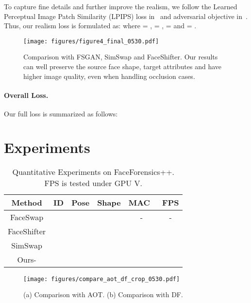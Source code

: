 \documentclass{article}
\begin{document}
To capture fine details and further improve the realism, we follow the Learned Perceptual Image Patch Similarity (LPIPS) loss in~\cite{zhang2018unreasonable} and adversarial objective in~\cite{choi2020stargan}.
Thus, our realism loss is formulated as:
where  = ,  = ,  =  and  = .




\begin{figure}[t] 
\begin{center} 
\texttt{[image: figures/figure4\_final\_0530.pdf]} 
\end{center} 
\vspace{-2mm}
\caption{Comparison with FSGAN, SimSwap and FaceShifter. Our results can well preserve the source face shape, target attributes and have higher image quality, even when handling occlusion cases.} 
\label{fig:compare_big} 
\end{figure}



\paragraph{Overall Loss.}Our full loss is summarized as follows:





\section{Experiments}


\begin{table}[t]
\centering
\small
\begin{tabular}{cccc|cc}
\toprule
Method & ID & Pose & Shape &MAC~ & FPS      \\
\midrule
FaceSwap    &   &  &  & - & -      \\
FaceShifter     &   &  &  &  &      \\
SimSwap   &   &  &  &  &     \\
\midrule 
Ours-     &   &  &  &  &    \\
\bottomrule
\end{tabular}
\vspace{-2mm}
\caption{Quantitative Experiments on FaceForensics++. FPS is tested under GPU V.}
\label{tab:qua}
\end{table}


\begin{figure}[t] 
\begin{center} 
\texttt{[image: figures/compare\_aot\_df\_crop\_0530.pdf]} 
\end{center} 
\vspace{-2mm}
\caption{(a) Comparison with AOT. (b) Comparison with DF.} 
\label{fig:compare_aot_df} 
\end{figure}
\end{document}
